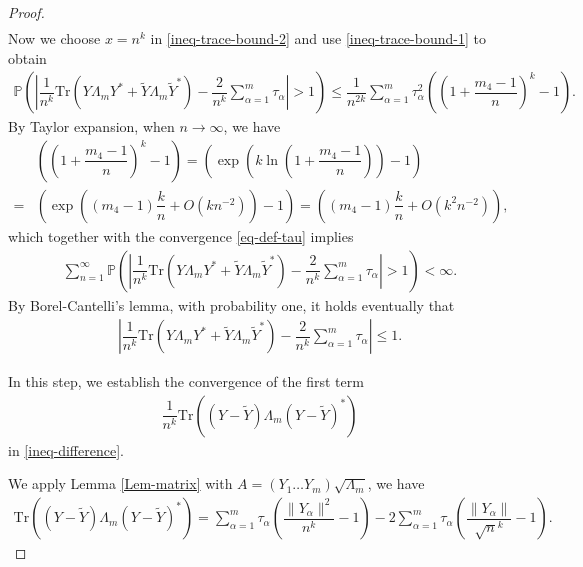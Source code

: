 \documentclass[12pt]{article}
\numberwithin{equation}{section} \theoremstyle{plain}
\def\bP{\mathbb P}
\def\Tr{\mathrm {Tr}}
\begin{document}
\begin{proof}
\begin{align}
\end{align}
Now we choose $x = n^k$ in \eqref{ineq-trace-bound-2} and use \eqref{ineq-trace-bound-1} to obtain
\begin{align*}
    \bP \left( \left| \dfrac{1}{n^k} \Tr \left( Y \Lambda_m Y^* + \widetilde Y \Lambda_m \widetilde Y^* \right) - \dfrac{2}{n^k} \sum_{\alpha=1}^m \tau_\alpha \right| > 1 \right)
    \le \dfrac{1}{n^{2k}} \sum_{\alpha=1}^m \tau_\alpha^2 \left( \left( 1 + \dfrac{m_4-1}{n} \right)^k - 1 \right).
\end{align*}
By Taylor expansion, when $n \to \infty$, we have
\begin{align} \label{eq-appro}
    & \left( \left( 1 + \dfrac{m_4-1}{n} \right)^k - 1 \right)
    = \left( \exp \left( k \ln \left( 1 + \dfrac{m_4-1}{n} \right) \right) - 1 \right) \nonumber \\
    =& \left( \exp \left( (m_4-1) \dfrac{k}{n} + O(kn^{-2}) \right) - 1 \right)
    = \left( (m_4-1) \dfrac{k}{n} + O(k^2n^{-2}) \right),
\end{align}
which together with the convergence \eqref{eq-def-tau} implies
\begin{align*}
    \sum_{n=1}^\infty \bP \left( \left| \dfrac{1}{n^k} \Tr \left( Y \Lambda_m Y^* + \widetilde Y \Lambda_m \widetilde Y^* \right) - \dfrac{2}{n^k} \sum_{\alpha=1}^m \tau_\alpha \right| > 1 \right) < \infty.
\end{align*}
By Borel-Cantelli's lemma, with probability one, it holds eventually that
\begin{align} \label{ineq-trace-bound-3}
    \left| \dfrac{1}{n^k} \Tr \left( Y \Lambda_m Y^* + \widetilde Y \Lambda_m \widetilde Y^* \right) - \dfrac{2}{n^k} \sum_{\alpha=1}^m \tau_\alpha \right| \le 1.
\end{align}

\bigskip

 In this step, we establish the convergence of the first term
\begin{align*}
    \dfrac{1}{n^k} \Tr \left( \left( Y - \widetilde Y \right) \Lambda_m \left( Y - \widetilde Y \right)^* \right)
\end{align*}
in \eqref{ineq-difference}.

We apply Lemma \ref{Lem-matrix} with $A = (Y_1 \ldots Y_m) \sqrt{\Lambda_m}$, we have
\begin{align} \label{ineq-trace-bound-4}
    \Tr \left( \left( Y - \widetilde Y \right) \Lambda_m \left( Y - \widetilde Y \right)^* \right)
    = \sum_{\alpha=1}^m \tau_\alpha \left( \dfrac{\|Y_\alpha\|^2}{n^k} - 1 \right) - 2 \sum_{\alpha=1}^m \tau_\alpha \left( \dfrac{\|Y_\alpha\|}{\sqrt n^k} - 1 \right).
\end{align}


\end{proof}
\end{document}
